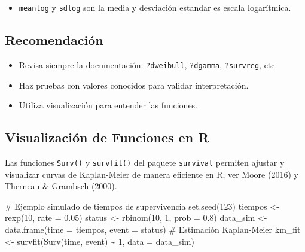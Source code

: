 \documentclass[
  letterpaper,
  DIV=11,
  numbers=noendperiod]{scrartcl}
\newenvironment{Shaded}{\begin{snugshade}}{\end{snugshade}}
\newcommand{\AttributeTok}[1]{\textcolor[rgb]{0.40,0.45,0.13}{#1}}
\newcommand{\CommentTok}[1]{\textcolor[rgb]{0.37,0.37,0.37}{#1}}
\newcommand{\DecValTok}[1]{\textcolor[rgb]{0.68,0.00,0.00}{#1}}
\newcommand{\FloatTok}[1]{\textcolor[rgb]{0.68,0.00,0.00}{#1}}
\newcommand{\FunctionTok}[1]{\textcolor[rgb]{0.28,0.35,0.67}{#1}}
\newcommand{\NormalTok}[1]{\textcolor[rgb]{0.00,0.23,0.31}{#1}}
\newcommand{\OtherTok}[1]{\textcolor[rgb]{0.00,0.23,0.31}{#1}}
\newcommand{\SpecialCharTok}[1]{\textcolor[rgb]{0.37,0.37,0.37}{#1}}
\providecommand{\tightlist}{%
  \setlength{\itemsep}{0pt}\setlength{\parskip}{0pt}}
\begin{document}
\begin{itemize}
\tightlist
\item
  \texttt{meanlog} y \texttt{sdlog} son la media y desviación estandar
  es escala logarítmica.
\end{itemize}

\subsection{Recomendación}\label{recomendaciuxf3n}

\begin{itemize}
\tightlist
\item
  Revisa siempre la documentación: \texttt{?dweibull}, \texttt{?dgamma},
  \texttt{?survreg}, etc.
\item
  Haz pruebas con valores conocidos para validar interpretación.
\item
  Utiliza visualización para entender las funciones.
\end{itemize}

\subsection{Visualización de Funciones en
R}\label{visualizaciuxf3n-de-funciones-en-r}

Las funciones \texttt{Surv()} y \texttt{survfit()} del paquete
\texttt{survival} permiten ajustar y visualizar curvas de Kaplan-Meier
de manera eficiente en R, ver Moore (2016) y Therneau \& Grambsch
(2000).

\begin{Shaded}
\begin{Highlighting}[]
\CommentTok{\# Ejemplo simulado de tiempos de supervivencia}
\FunctionTok{set.seed}\NormalTok{(}\DecValTok{123}\NormalTok{)}
\NormalTok{tiempos }\OtherTok{\textless{}{-}} \FunctionTok{rexp}\NormalTok{(}\DecValTok{10}\NormalTok{, }\AttributeTok{rate =} \FloatTok{0.05}\NormalTok{)}
\NormalTok{status }\OtherTok{\textless{}{-}} \FunctionTok{rbinom}\NormalTok{(}\DecValTok{10}\NormalTok{, }\DecValTok{1}\NormalTok{, }\AttributeTok{prob =} \FloatTok{0.8}\NormalTok{)}
\NormalTok{data\_sim }\OtherTok{\textless{}{-}} \FunctionTok{data.frame}\NormalTok{(}\AttributeTok{time =}\NormalTok{ tiempos, }\AttributeTok{event =}\NormalTok{ status)}
\CommentTok{\# Estimación Kaplan{-}Meier}
\NormalTok{km\_fit }\OtherTok{\textless{}{-}} \FunctionTok{survfit}\NormalTok{(}\FunctionTok{Surv}\NormalTok{(time, event) }\SpecialCharTok{\textasciitilde{}} \DecValTok{1}\NormalTok{, }\AttributeTok{data =}\NormalTok{ data\_sim)}
\end{Highlighting}
\end{Shaded}
\end{document}
